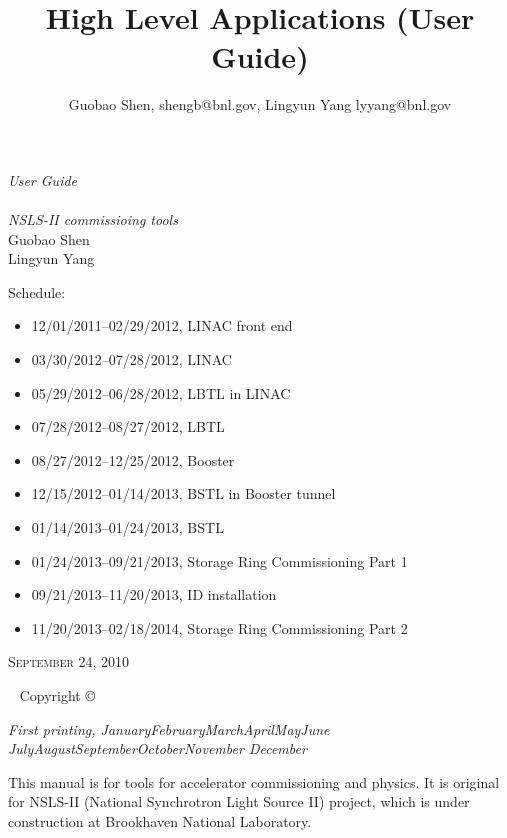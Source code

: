 \documentclass[letterpaper,showtrims]{memoir}
\title{High Level Applications (User Guide)}
\author{Guobao Shen, shengb@bnl.gov, Lingyun Yang lyyang@bnl.gov}
\newcommand{\monthyear}{%
  \ifcase\month\or January\or February\or March\or April\or May\or June\or
  July\or August\or September\or October\or November\or
  December\fi\space\number\year
}
\begin{document}
\begin{titlingpage}
{\begingroup%
\raggedleft
\vspace*{\baselineskip}
{\Huge\itshape User Guide} \\
\vspace*{\baselineskip}{\Huge\itshape of High Level Applications}\\[\baselineskip]
{\large\itshape NSLS-II commissioing tools}\\[0.2\textheight]
{\Large Guobao Shen\\Lingyun Yang}\par
\vfill
\flushleft
{\sffamily
  Schedule:\hfill
\begin{itemize}
\item 12/01/2011--02/29/2012, LINAC front end
\item 03/30/2012--07/28/2012, LINAC
\item 05/29/2012--06/28/2012, LBTL in LINAC
\item 07/28/2012--08/27/2012, LBTL
\item 08/27/2012--12/25/2012, Booster
\item 12/15/2012--01/14/2013, BSTL in Booster tunnel
\item 01/14/2013--01/24/2013, BSTL
\item 01/24/2013--09/21/2013, Storage Ring Commissioning Part 1
\item 09/21/2013--11/20/2013, ID installation
\item 11/20/2013--02/18/2014, Storage Ring Commissioning Part 2
\end{itemize}
}
\vspace*{5ex}
{\small\scshape September 24, 2010}
\vspace*{\baselineskip}
\endgroup}
\end{titlingpage}


\newpage
~\vfill
\thispagestyle{empty}
\setlength{\parindent}{0pt}
\setlength{\parskip}{\baselineskip}
Copyright \copyright\ %

\par\textit{First printing, \monthyear}

This manual is for tools for accelerator commissioning and physics. It
is original for NSLS-II (National Synchrotron Light Source II)
project, which is under construction at Brookhaven National
Laboratory. 
\end{document}
